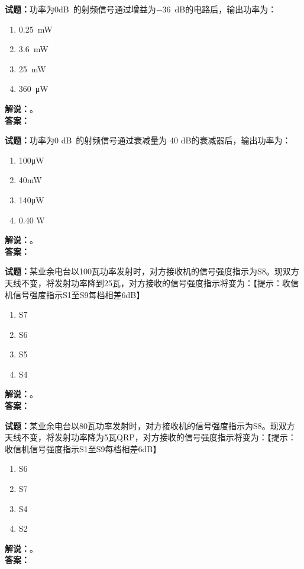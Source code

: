 \documentclass{ctexbook}
\begin{document}
\vspace{\baselineskip}

\noindent\textbf{试题：}功率为\num{0}\unit[qualifier-mode=combine]{\deci\bel{}}的射频信号通过增益为\SI{-36}{\dB}的电路后，输出功率为：
\begin{enumerate}[leftmargin=3em]
  \item \SI{0.25}{\mW}
  \item \SI{3.6}{\mW}
  \item \SI{25}{\mW}
  \item \SI{360}{\uW}
\end{enumerate}
\noindent\textbf{解说：}\textbf{}。\\\noindent\textbf{答案：}

\vspace{\baselineskip}

\noindent\textbf{试题：}功率为0 \unit[qualifier-mode=combine]{\deci\bel{}}的射频信号通过衰减量为 40 dB的衰减器后，输出功率为：
\begin{enumerate}[leftmargin=3em]
  \item 100μW
  \item 40mW
  \item 140μW
  \item 0.40 W
\end{enumerate}
\noindent\textbf{解说：}\textbf{}。\\\noindent\textbf{答案：}

\vspace{\baselineskip}

\noindent\textbf{试题：}某业余电台以100瓦功率发射时，对方接收机的信号强度指示为S8。现双方天线不变，将发射功率降到25瓦，对方接收的信号强度指示将变为：【提示：收信机信号强度指示S1至S9每档相差6dB】
\begin{enumerate}[leftmargin=3em]
  \item S7
  \item S6
  \item S5
  \item S4
\end{enumerate}
\noindent\textbf{解说：}\textbf{}。\\\noindent\textbf{答案：}

\vspace{\baselineskip}

\noindent\textbf{试题：}某业余电台以80瓦功率发射时，对方接收机的信号强度指示为S8。现双方天线不变，将发射功率降为5瓦QRP，对方接收的信号强度指示将变为：【提示：收信机信号强度指示S1至S9每档相差6dB】
\begin{enumerate}[leftmargin=3em]
  \item S6
  \item S7
  \item S4
  \item S2
\end{enumerate}
\noindent\textbf{解说：}\textbf{}。\\\noindent\textbf{答案：}
\end{document}
